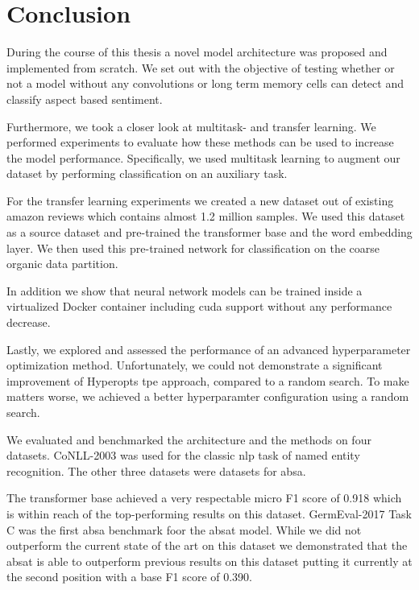 \chapter{Conclusion}
\label{ch:conclusion}
During the course of this thesis a novel model architecture was proposed and implemented from scratch. We set out with the objective of testing whether or not a model without any convolutions or long term memory cells can detect and classify aspect based sentiment.
\medskip

Furthermore, we took a closer look at multitask- and transfer learning. We performed experiments to evaluate how these methods can be used to increase the model performance. Specifically, we used multitask learning to augment our dataset by performing classification on an auxiliary task. 
\smallskip

For the transfer learning experiments we created a new dataset out of existing amazon reviews which contains almost 1.2 million samples. We used this dataset as a source dataset and pre-trained the transformer base and the word embedding layer. We then used this pre-trained network for classification on the coarse organic data partition.
\medskip

In addition we show that neural network models can be trained inside a virtualized Docker container including \gls{cuda} support without any performance decrease. 
\medskip

Lastly, we explored and assessed the performance of an advanced hyperparameter optimization method. Unfortunately, we could not demonstrate a significant improvement of Hyperopts \gls{tpe} approach, compared to a random search. To make matters worse, we achieved a better hyperparamter configuration using a random search.
\bigskip

We evaluated and benchmarked the architecture and the methods on four datasets. CoNLL-2003 was used for the classic \gls{nlp} task of named entity recognition. The other three datasets were datasets for \gls{absa}.
\medskip

The transformer base achieved a very respectable micro F1 score of 0.918 which is within reach of the top-performing results on this dataset. GermEval-2017 Task C was the first \gls{absa} benchmark foor the \gls{absat} model. While we did not outperform the current state of the art on this dataset we demonstrated that the \gls{absat} is able to outperform previous results on this dataset putting it currently at the second position with a base F1 score of 0.390. 
\medskip

